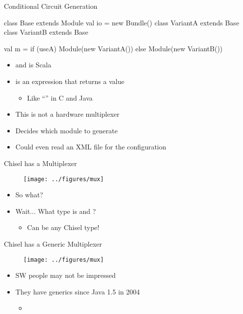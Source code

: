 \begin{frame}[fragile]{Conditional Circuit Generation}
\begin{chisel}
class Base extends Module { val io = new Bundle() }
class VariantA extends Base { }
class VariantB extends Base { }

val m = if (useA) Module(new VariantA())
        else Module(new VariantB())
\end{chisel}
\begin{itemize}
\item {} and  is Scala
\item {} is an expression that returns a value
\begin{itemize}
\item Like ``'' in C and Java
\end{itemize}
\item This is not a hardware multiplexer
\item Decides which module to generate
\item Could even read an XML file for the configuration
\end{itemize}
\end{frame}

\begin{frame}[fragile]{Chisel has a Multiplexer}
\begin{figure}
  \texttt{[image: ../figures/mux]}
\end{figure}
\begin{itemize}
\item So what?
\item Wait... What type is  and ?
\begin{itemize}
\item Can be any Chisel type!
\end{itemize}
\end{itemize}
\end{frame}

\begin{frame}[fragile]{Chisel has a Generic Multiplexer}
\begin{figure}
  \texttt{[image: ../figures/mux]}
\end{figure}
\begin{itemize}
\item SW people may not be impressed
\item They have generics since Java 1.5 in 2004
\begin{itemize}
\item {}
\end{itemize}
\end{itemize}
\end{frame}


